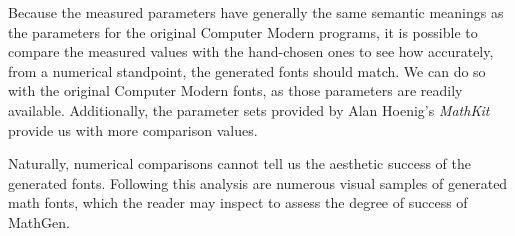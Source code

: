 
Because the measured parameters have generally the same semantic meanings as the
parameters for the original Computer Modern programs, it is possible to compare
the measured values with the hand-chosen ones to see how accurately, from a
numerical standpoint, the generated fonts should match. We can do so with the
original Computer Modern fonts, as those parameters are readily available.
Additionally, the parameter sets provided by Alan Hoenig's \emph{MathKit}
provide us with more comparison values.

Naturally, numerical comparisons cannot tell us the aesthetic success of the
generated fonts. Following this analysis are numerous visual samples of
generated math fonts, which the reader may inspect to assess the degree of
success of MathGen.
